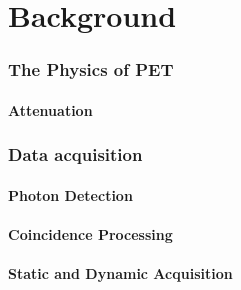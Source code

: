 \chapter{Background} \label{background}
    \blindtext
    
        \blindtext
        
        \subsection{The Physics of PET} \label{the_physics_of_pet}
            \blindtext
            
            \subsubsection{Attenuation} \label{attenuation}
                \blindtext
        
        \subsection{Data acquisition} \label{data_acquisition}
            \blindtext
            
            \subsubsection{Photon Detection} \label{photon_detection}
                \blindtext
            
            \subsubsection{Coincidence Processing} \label{coincidence_processing}
                \blindtext
            
            \subsubsection{Static and Dynamic Acquisition} \label{static_and_dynamic_acquisition}
                \blindtext
            
